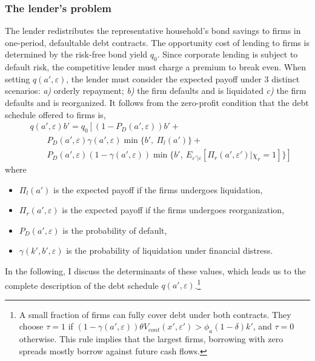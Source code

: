 \documentclass[12pt]{article}
\begin{document}
\subsubsection{The lender's problem}    \label{sec: The lender's problem}
The lender redistributes the representative household's bond savings to firms in one-period, defaultable debt contracts. The opportunity cost of lending to firms is determined by the risk-free bond yield $q_0$. Since corporate lending is subject to default risk, the competitive lender must charge a premium to break even. When setting $q(a',\varepsilon)$, the lender must consider the expected payoff under 3 distinct scenarios: \textit{a)} orderly repayment; \textit{b)} the firm defaults and is liquidated \textit{c)} the firm defaults and is reorganized. It follows from the zero-profit condition that the debt schedule offered to firms is, 
\begin{equation} \label{eq:q}
    \begin{split}
        & q(a', \varepsilon)b' = q_0 \left[ \left(1-P_D(a', \varepsilon)\right)b' + \right. \\
        & \qquad P_D(a', \varepsilon) \gamma(a', \varepsilon) \min \{b', \ \Pi_{l}(a')\} + \\ 
        & \qquad \left. P_D(a', \varepsilon) (1-\gamma(a', \varepsilon))\min \{b', \ E_{\varepsilon' | \varepsilon} [ \Pi_{r}(a', \varepsilon') |\chi_r = 1 ] \} \right]
    \end{split}
\end{equation}
where 
\begin{itemize}\setlength\itemsep{0em} 
    \item $\Pi_{l}(a')$ is the expected payoff if the firms undergoes liquidation,
    \item $\Pi_{r}(a', \varepsilon)$ is the expected payoff if the firms undergoes reorganization,
    \item $P_D(a', \varepsilon)$ is the probability of default,
    \item $\gamma(k',b', \varepsilon)$ is the probability of liquidation under financial distress. 
\end{itemize} 

In the following, I discuss the determinants of these values, which leads us to the complete description of the debt schedule $q(a', \varepsilon)$.\footnote{A small fraction of firms can fully cover debt under both contracts. They choose $\tau=1$ if $(1-\gamma(a',\varepsilon))\theta V_{cont}(x',\varepsilon') > \phi_a(1-\delta)k'$, and $\tau=0$ otherwise. This rule implies that the largest firms, borrowing with zero spreads mostly borrow against future cash flows.}
\end{document}
